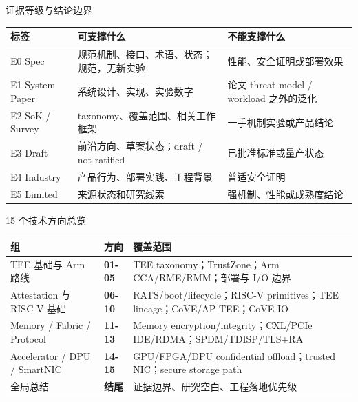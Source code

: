 \begin{frame}[t]{证据等级与结论边界}
\scriptsize
\begin{tabularx}{\textwidth}{@{}lYY@{}}
\toprule
标签 & 可支撑什么 & 不能支撑什么 \\
\midrule
E0 Spec & 规范机制、接口、术语、状态；规范，无新实验 & 性能、安全证明或部署效果 \\
E1 System Paper & 系统设计、实现、实验数字 & 论文 threat model / workload 之外的泛化 \\
E2 SoK / Survey & taxonomy、覆盖范围、相关工作框架 & 一手机制实验或产品结论 \\
E3 Draft & 前沿方向、草案状态；draft / not ratified & 已批准标准或量产状态 \\
E4 Industry & 产品行为、部署实践、工程背景 & 普适安全证明 \\
E5 Limited & 来源状态和研究线索 & 强机制、性能或成熟度结论 \\
\bottomrule
\end{tabularx}
\end{frame}

\begin{frame}[t]{15 个技术方向总览}
\scriptsize
\begin{tabularx}{\textwidth}{@{}l l Y@{}}
\toprule
组 & 方向 & 覆盖范围 \\
\midrule
TEE 基础与 Arm 路线 & \textcolor{Accent}{\bfseries 01-05} & TEE taxonomy；TrustZone；Arm CCA/RME/RMM；部署与 I/O 边界 \\
Attestation 与 RISC-V 基础 & \textcolor{Accent}{\bfseries 06-10} & RATS/boot/lifecycle；RISC-V primitives；TEE lineage；CoVE/AP-TEE；CoVE-IO \\
Memory / Fabric / Protocol & \textcolor{Accent}{\bfseries 11-13} & Memory encryption/integrity；CXL/PCIe IDE/RDMA；SPDM/TDISP/TLS+RA \\
Accelerator / DPU / SmartNIC & \textcolor{Accent}{\bfseries 14-15} & GPU/FPGA/DPU confidential offload；trusted NIC；secure storage path \\
全局总结 & \textcolor{Accent}{\bfseries 结尾} & 证据边界、研究空白、工程落地优先级 \\
\bottomrule
\end{tabularx}
\end{frame}
